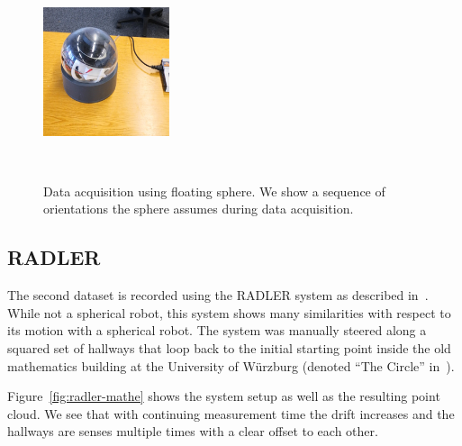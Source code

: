 \begin{figure}
\begin{minipage}[c]{0.45\textwidth}
		\includegraphics[width=0.33\textwidth]{./images/sphere-frame-6.eps}\hfill
	\end{minipage}\\
	\caption{Data acquisition using floating sphere. We show a sequence of orientations the sphere assumes during data acquisition.}
	\label{fig:float-sat-sphere}
\end{figure}

\iffalse %
	\subsection{RADLER}

	The second dataset is recorded using the RADLER system as described in~\cite{Borrmann2020-RADLER}.
	While not a spherical robot, this system shows many similarities with respect to its motion with a spherical robot.
	The system was manually steered along a squared set of hallways that loop back to the initial starting point inside the old mathematics building at the University of Würzburg (denoted ``The Circle'' in~\cite{Borrmann2020-RADLER}).

	Figure~\ref{fig:radler-mathe} shows the system setup as well as the resulting point cloud.
	We see that with continuing measurement time the drift increases and the hallways are senses multiple times with a clear offset to each other. 

